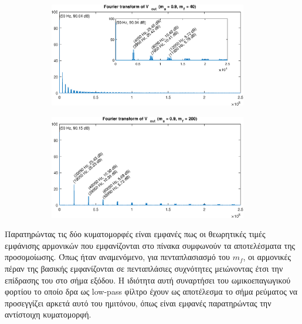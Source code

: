\begin{figure}[h!]
	\begin{subfigure}{0.49\textwidth}
		\centering
		\includegraphics[width=0.95\textwidth]{Images/FV_out_40}
	\end{subfigure}
	\begin{subfigure}{0.49\textwidth}
		\centering
		\includegraphics[width=0.95\textwidth]{Images/FV_out_200}
	\end{subfigure}
\end{figure}

\noindent
Παρατηρώντας τις δύο κυματομορφές είναι εμφανές πως οι θεωρητικές τιμές εμφάνισης αρμονικών που εμφανίζονται στο πίνακα συμφωνούν τα αποτελέσματα της προσομοίωσης. Όπως ήταν αναμενόμενο, για πενταπλασιασμό του $m_f$, οι αρμονικές πέραν της βασικής εμφανίζονται σε πενταπλάσιες συχνότητες μειώνοντας έτσι την επίδρασης του στο σήμα εξόδου. Η ιδιότητα αυτή συναρτήσει του ωμικοεπαγωγικού φορτίου το οποίο δρα ως low-pass φίλτρο έχουν ως αποτέλεσμα το σήμα ρεύματος να προσεγγίζει αρκετά αυτό του ημιτόνου, όπως είναι εμφανές παρατηρώντας την αντίστοιχη κυματομορφή. 

